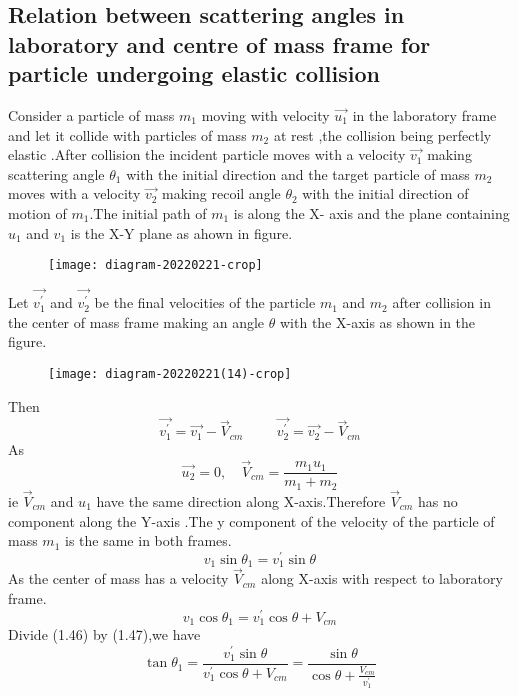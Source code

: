  \subsection{Relation between scattering angles in laboratory and centre of mass frame for particle undergoing elastic collision}
 Consider a particle of mass $m_1$ moving with velocity $\vec{u_1}$ in the laboratory frame and let it collide with particles of mass $m_2$ at rest ,the collision being perfectly elastic .After collision the incident particle moves with a velocity $\vec{v_1}$ making scattering angle $\theta_{1}$ with the initial direction and the target particle of mass $m_2$ moves with a velocity $\vec{v_2}$ making recoil angle $\theta_{2}$ with the initial direction of motion of $m_1$.The initial path of $m_1$ is along the X- axis and the plane containing $u_1$ and $v_1$ is the X-Y plane as ahown in figure.\\
 \begin{figure}[H]
 	\centering
 	\texttt{[image: diagram-20220221-crop]}
 	\caption{}
 	\label{}
 \end{figure}
 Let $\vec{v_1^{\prime}}$ and $\vec{v_2^{\prime}}$ be the final velocities of the particle $m_1$ and $m_2$ after collision in the center of mass frame making an angle $\theta$ with the X-axis as shown in the figure.
 \begin{figure}[H]
 	\centering
 	\texttt{[image: diagram-20220221(14)-crop]}
 	\caption{}
 	\label{}
 \end{figure}
 Then\\
 $$\vec{v_1^{\prime}}=\vec{v_1}-\vec{V}_{cm} \hspace{1cm} \vec{v_2^{\prime}}=\vec{v_2}-\vec{V}_{cm}$$
As $$\vec{u_2}=0 ,\quad \vec{V}_{cm}=\frac{m_1u_1}{m_1+m_2}$$
ie $\vec{V}_{cm}$ and $u_1$ have the same direction along X-axis.Therefore $\vec{V}_{cm}$ has no component along the Y-axis .The y component of the velocity of the particle of mass $m_1$ is the same in both frames.
\begin{equation}
v_1\sin\theta_1=v_1^{\prime}\sin\theta
\end{equation}
As the center of mass has a velocity $\vec{V}_{cm}$ along X-axis with respect to laboratory frame.
\begin{equation}
v_1\cos \theta_{1}=v_1^{\prime}\cos\theta +V_{cm}
\end{equation}
 Divide (1.46) by (1.47),we have \\
 $$\tan\theta_{1}=\frac{v_1^{\prime}\sin\theta}{v_1^{\prime}\cos\theta +V_{cm}}=\frac{\sin\theta}{\cos \theta +\frac{V_{cm}}{v_1^{\prime}}}$$
